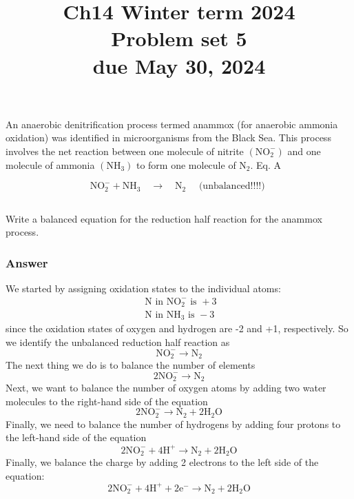 \documentclass[12pt]{article}
\title{Ch14 Winter term 2024 \\
 Problem set 5 \\
 due May 30, 2024 }
\author{}
\date{}
\begin{document}
\maketitle
\section{}
An anaerobic denitrification process termed anammox (for anaerobic ammonia oxidation) was identified in microorganisms from the Black Sea. This process involves the net reaction between one molecule of nitrite $\left(\mathrm{NO}_{2}^{-}\right)$ and one molecule of ammonia $\left(\mathrm{NH}_{3}\right)$ to form one molecule of $\mathrm{N}_{2}$. Eq. A

$$
\mathrm{NO}_{2}^{-}+\mathrm{NH}_{3} \quad \rightarrow \quad \mathrm{N}_{2} \quad \text { (unbalanced!!!!) }
$$
\subsection{}

Write a balanced equation for the reduction half reaction for the anammox process.
\subsubsection{Answer}
We started by assigning oxidation states to the individual atoms:
\begin{equation}
\begin{array}{l}
\text { N in } \mathrm{NO}_{2}^{-} \text { is }+3 \\
\text { N in } \mathrm{NH}_{3} \text { is }-3
\end{array}
\end{equation}
since the oxidation states of oxygen and hydrogen are -2 and +1, respectively.
So we identify the unbalanced reduction half reaction as
\begin{equation}
\mathrm{NO}_{2}^{-} \rightarrow \mathrm{N}_{2}
\end{equation}
The next thing we do is to balance the number of elements 
\begin{equation}
2 \mathrm{NO}_{2}^{-} \rightarrow \mathrm{N}_{2}
\end{equation}
Next, we want to balance the number of oxygen atoms by adding two water molecules to the right-hand side of the equation
\begin{equation}
2 \mathrm{NO}_{2}^{-} \rightarrow \mathrm{N}_{2}+2 \mathrm{H}_{2} \mathrm{O}
\end{equation}
Finally, we need to balance the number of hydrogens by adding four protons to the left-hand side of the equation
\begin{equation}
2 \mathrm{NO}_{2}^{-}+4 \mathrm{H}^{+} \rightarrow \mathrm{N}_{2}+2 \mathrm{H}_{2} \mathrm{O}
\end{equation}
Finally, we balance the charge by adding 2 electrons to the left side of the equation:
\begin{equation}
2 \mathrm{NO}_{2}^{-}+4 \mathrm{H}^{+}+2 \mathrm{e}^{-} \rightarrow \mathrm{N}_{2}+2 \mathrm{H}_{2} \mathrm{O}
\end{equation}
\end{document}
